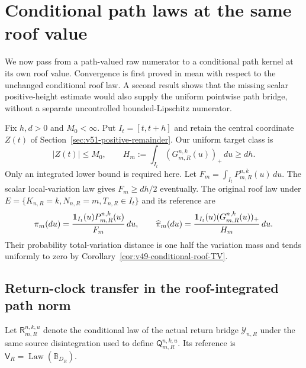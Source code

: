 \section{Conditional path laws at the same roof value}
\label{sec:v52-same-roof}
We now pass from a path-valued raw numerator to a conditional path
kernel at its own roof value. Convergence is first proved in mean
with respect to the unchanged conditional roof law. A second result
shows that the missing scalar positive-height estimate would also
supply the uniform pointwise path bridge, without a separate
uncontrolled bounded-Lipschitz numerator.

Fix $h,d>0$ and $M_0<\infty$. Put $I_t=[t,t+h]$ and retain the
central coordinate $Z(t)$ of Section~\ref{sec:v51-positive-remainder}.
Our uniform target class is
\begin{equation}\label{eq:v52-target-class}
 |Z(t)|\le M_0,\qquad
 H_m:=\int_{I_t}(G_{m,R}^{n,k}(u))_+\,du\ge dh.
\end{equation}
Only an integrated lower bound is required here. Let
$F_m=\int_{I_t}P_{m,R}^{n,k}(u)\,du$. The scalar local-variation
law gives $F_m\ge dh/2$ eventually. The original roof law under
$E=\{K_{n,R}=k,N_{n,R}=m,T_{n,R}\in I_t\}$ and its reference are
\[
 \pi_m(du)=\frac{\mathbf1_{I_t}(u)P_{m,R}^{n,k}(u)}{F_m}\,du,
 \qquad
 \widehat\pi_m(du)=\frac{\mathbf1_{I_t}(u)(G_{m,R}^{n,k}(u))_+}{H_m}\,du.
\]
Their probability total-variation distance is one half the variation
mass and tends uniformly to zero by
Corollary~\ref{cor:v49-conditional-roof-TV}.

\subsection{Return-clock transfer in the roof-integrated path norm}
Let $\mathsf R_{m,R}^{n,k,u}$ denote the conditional law of the actual
return bridge $\mathcal Y_{n,R}$ under the same source disintegration
used to define $\mathsf Q_{m,R}^{n,k,u}$. Its reference is
$\mathsf V_R=\operatorname{Law}(\mathbb B_{D_R})$.

